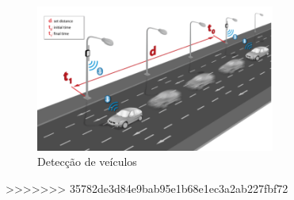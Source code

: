 \begin{figure}[htb]
	\caption{\label{meshlium-carros}Detecção de veículos}
	\begin{center}
		\includegraphics[width=0.70\textwidth]{img/meshlium-carros.png}
	\end{center}
\end{figure}
>>>>>>> 35782de3d84e9bab95e1b68e1ec3a2ab227fbf72
